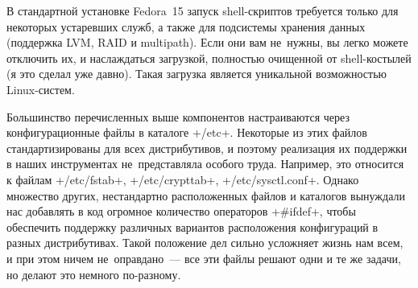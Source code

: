 \documentclass[10pt,oneside,a4paper]{article}
\begin{document}
В стандартной установке Fedora~15 запуск shell-скриптов требуется только для
некоторых устаревших служб, а также для подсистемы хранения данных (поддержка
LVM, RAID и multipath). Если они вам не~нужны, вы легко можете отключить их, и
наслаждаться загрузкой, полностью очищенной от shell-костылей (я это сделал уже
давно). Такая загрузка является уникальной возможностью Linux-систем.

Большинство перечисленных выше компонентов настраиваются через конфигурационные
файлы в каталоге +/etc+. Некоторые из этих файлов стандартизированы для всех
дистрибутивов, и поэтому реализация их поддержки в наших инструментах
не~представляла особого труда. Например, это относится к файлам +/etc/fstab+,
+/etc/crypttab+, +/etc/sysctl.conf+. Однако множество других, нестандартно
расположенных файлов и каталогов вынуждали нас добавлять в код огромное
количество операторов +#ifdef+, чтобы обеспечить поддержку различных вариантов
расположения конфигураций в разных дистрибутивах. Такой положение дел сильно
усложняет жизнь нам всем, и при этом ничем не~оправдано~--- все эти файлы решают
одни и те же задачи, но делают это немного по-разному.
\end{document}
